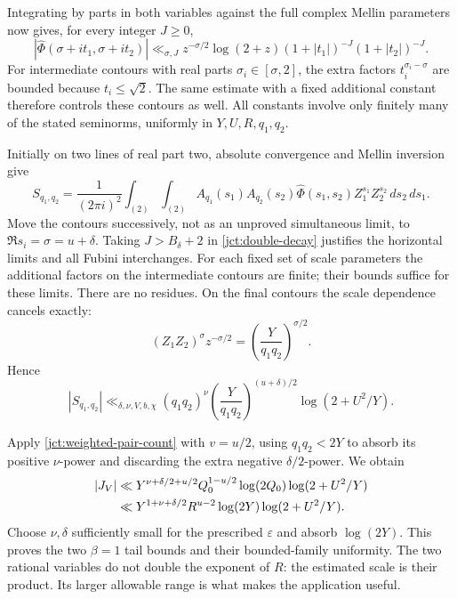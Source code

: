 Integrating by parts in both variables against the full complex
Mellin parameters now gives, for every integer \(J\ge0\),
\begin{equation}
 |\widehat\Phi(\sigma+it_1,\sigma+it_2)|
 \ll_{\sigma,J}z^{-\sigma/2}\log(2+z)
 (1+|t_1|)^{-J}(1+|t_2|)^{-J}.
 \label{jct:double-decay}
\end{equation}
For intermediate contours with real parts \(\sigma_i\in[\sigma,2]\),
the extra factors \(t_i^{\sigma_i-\sigma}\) are bounded because
\(t_i\le\sqrt2\).  The same estimate with a fixed additional
constant therefore controls these contours as well.
All constants involve only finitely many of the stated
seminorms, uniformly in \(Y,U,R,q_1,q_2\).

Initially on two lines of real part two, absolute convergence
and Mellin inversion give
\begin{equation}
 S_{q_1,q_2}=\frac1{(2\pi i)^2}\int_{(2)}\int_{(2)}
 A_{q_1}(s_1)A_{q_2}(s_2)\widehat\Phi(s_1,s_2)
 Z_1^{s_1}Z_2^{s_2}\,ds_2\,ds_1.
 \label{jct:double-inversion}
\end{equation}
Move the contours successively, not as an unproved simultaneous
limit, to \(\Re s_i=\sigma=u+\delta\).
Taking \(J>B_\delta+2\) in \eqref{jct:double-decay} justifies
the horizontal limits and all Fubini interchanges.  For each
fixed set of scale parameters the additional factors on the
intermediate contours are finite; their bounds suffice for
these limits.  There are no residues.  On the final contours
the scale dependence cancels exactly:
\begin{equation}
 (Z_1Z_2)^\sigma z^{-\sigma/2}
 =\left(\frac{Y}{q_1q_2}\right)^{\sigma/2}.
 \label{jct:scale-cancellation}
\end{equation}
Hence
\begin{equation}
 |S_{q_1,q_2}|\ll_{\delta,\nu,V,b,\chi}
 (q_1q_2)^\nu
 \left(\frac{Y}{q_1q_2}\right)^{(u+\delta)/2}
 \log(2+U^2/Y).
 \label{jct:inner-bound}
\end{equation}

Apply \eqref{jct:weighted-pair-count} with \(v=u/2\), using
\(q_1q_2<2Y\) to absorb its positive \(\nu\)-power and
discarding the extra negative \(\delta/2\)-power.  We obtain
\begin{align}
 |J_V|&\ll Y^{\nu+\delta/2+u/2}
 Q_0^{1-u/2}\log(2Q_0)\log(2+U^2/Y)\notag\\
 &\ll Y^{1+\nu+\delta/2}R^{u-2}
 \log(2Y)\log(2+U^2/Y).
 \label{jct:tail-before-epsilon}
\end{align}
Choose \(\nu,\delta\) sufficiently small for the prescribed
\(\varepsilon\) and absorb \(\log(2Y)\).
This proves the two \(\beta=1\) tail bounds and their bounded-family
uniformity.
The two rational variables do not double the exponent of \(R\):
the estimated scale is their product.  Its larger allowable
range is what makes the application useful.

